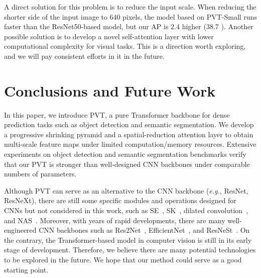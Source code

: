 \documentclass[10pt,twocolumn,letterpaper]{article}
\def\eg{\emph{e.g.}}
\begin{document}
A direct solution for this problem is to reduce the input scale. When reducing the shorter side of the input image to 640 pixels, the model based on PVT-Small runs faster than the ResNet50-based model, but our AP is 2.4 higher (38.7 ).
Another possible solution is to develop a novel self-attention layer with lower computational complexity for visual tasks. This is a direction worth exploring, and we will pay consistent efforts in it in the future.

\section{Conclusions and Future Work}

In this paper, we introduce PVT, a pure Transformer backbone for dense prediction tasks such as object detection and semantic segmentation. 
We develop a progressive shrinking pyramid and a spatial-reduction attention layer to obtain multi-scale feature maps under limited computation/memory resources.
Extensive experiments on object detection and semantic segmentation benchmarks verify that our PVT is stronger than well-designed CNN backbones under comparable numbers of parameters.




Although PVT can serve as an alternative to the CNN backbone (\eg, ResNet, ResNeXt), there are still some specific modules and operations designed for CNNs but not considered in this work, such as 
SE~\cite{hu2018squeeze}, SK~\cite{li2019selective}, dilated convolution~\cite{yu2015multi}, and NAS~\cite{tan2019efficientnet}.
Moreover, with years of rapid developments, there are many well-engineered CNN backbones such as Res2Net~\cite{gao2019res2net}, EfficientNet~\cite{tan2019efficientnet}, and ResNeSt~\cite{zhang2020resnest}.
On the contrary, the Transformer-based model in computer vision is still in its early stage of development. 
Therefore, 
we believe there are many potential technologies to be explored in the future. We hope that our method could serve as a good starting point.










{\small


}
\end{document}
